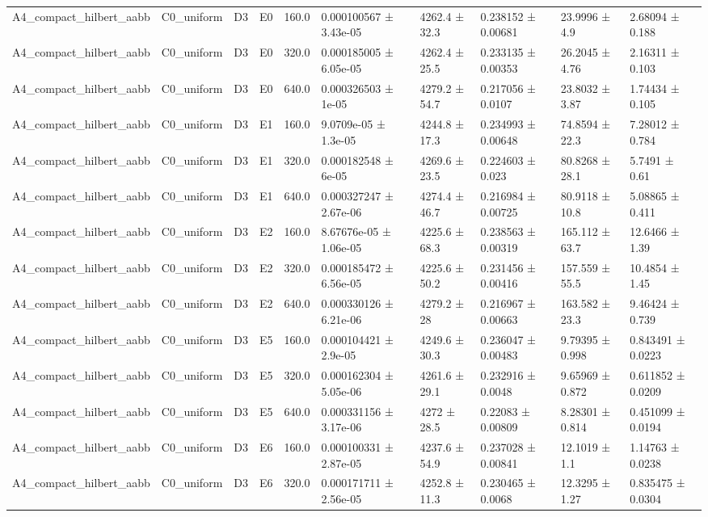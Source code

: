 \begin{table}
\begin{tabular}{llllllllll}
A4\_compact\_hilbert\_aabb & C0\_uniform & D3 & E0 & 160.0 & 0.000100567 ± 3.43e-05 & 4262.4 ± 32.3 & 0.238152 ± 0.00681 & 23.9996 ± 4.9 & 2.68094 ± 0.188 \\
A4\_compact\_hilbert\_aabb & C0\_uniform & D3 & E0 & 320.0 & 0.000185005 ± 6.05e-05 & 4262.4 ± 25.5 & 0.233135 ± 0.00353 & 26.2045 ± 4.76 & 2.16311 ± 0.103 \\
A4\_compact\_hilbert\_aabb & C0\_uniform & D3 & E0 & 640.0 & 0.000326503 ± 1e-05 & 4279.2 ± 54.7 & 0.217056 ± 0.0107 & 23.8032 ± 3.87 & 1.74434 ± 0.105 \\
A4\_compact\_hilbert\_aabb & C0\_uniform & D3 & E1 & 160.0 & 9.0709e-05 ± 1.3e-05 & 4244.8 ± 17.3 & 0.234993 ± 0.00648 & 74.8594 ± 22.3 & 7.28012 ± 0.784 \\
A4\_compact\_hilbert\_aabb & C0\_uniform & D3 & E1 & 320.0 & 0.000182548 ± 6e-05 & 4269.6 ± 23.5 & 0.224603 ± 0.023 & 80.8268 ± 28.1 & 5.7491 ± 0.61 \\
A4\_compact\_hilbert\_aabb & C0\_uniform & D3 & E1 & 640.0 & 0.000327247 ± 2.67e-06 & 4274.4 ± 46.7 & 0.216984 ± 0.00725 & 80.9118 ± 10.8 & 5.08865 ± 0.411 \\
A4\_compact\_hilbert\_aabb & C0\_uniform & D3 & E2 & 160.0 & 8.67676e-05 ± 1.06e-05 & 4225.6 ± 68.3 & 0.238563 ± 0.00319 & 165.112 ± 63.7 & 12.6466 ± 1.39 \\
A4\_compact\_hilbert\_aabb & C0\_uniform & D3 & E2 & 320.0 & 0.000185472 ± 6.56e-05 & 4225.6 ± 50.2 & 0.231456 ± 0.00416 & 157.559 ± 55.5 & 10.4854 ± 1.45 \\
A4\_compact\_hilbert\_aabb & C0\_uniform & D3 & E2 & 640.0 & 0.000330126 ± 6.21e-06 & 4279.2 ± 28 & 0.216967 ± 0.00663 & 163.582 ± 23.3 & 9.46424 ± 0.739 \\
A4\_compact\_hilbert\_aabb & C0\_uniform & D3 & E5 & 160.0 & 0.000104421 ± 2.9e-05 & 4249.6 ± 30.3 & 0.236047 ± 0.00483 & 9.79395 ± 0.998 & 0.843491 ± 0.0223 \\
A4\_compact\_hilbert\_aabb & C0\_uniform & D3 & E5 & 320.0 & 0.000162304 ± 5.05e-06 & 4261.6 ± 29.1 & 0.232916 ± 0.0048 & 9.65969 ± 0.872 & 0.611852 ± 0.0209 \\
A4\_compact\_hilbert\_aabb & C0\_uniform & D3 & E5 & 640.0 & 0.000331156 ± 3.17e-06 & 4272 ± 28.5 & 0.22083 ± 0.00809 & 8.28301 ± 0.814 & 0.451099 ± 0.0194 \\
A4\_compact\_hilbert\_aabb & C0\_uniform & D3 & E6 & 160.0 & 0.000100331 ± 2.87e-05 & 4237.6 ± 54.9 & 0.237028 ± 0.00841 & 12.1019 ± 1.1 & 1.14763 ± 0.0238 \\
A4\_compact\_hilbert\_aabb & C0\_uniform & D3 & E6 & 320.0 & 0.000171711 ± 2.56e-05 & 4252.8 ± 11.3 & 0.230465 ± 0.0068 & 12.3295 ± 1.27 & 0.835475 ± 0.0304 \\

\end{tabular}
\end{table}
